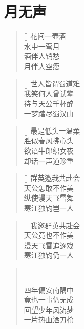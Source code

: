 \chapter{月无声}
\thispagestyle{empty}

\renewcommand{\poemtoc}{section}
\settowidth{\versewidth}{花间一壶酒}
\begin{verse}[\versewidth]
花间一壶酒\\
水中一弯月\\
酒伴人销愁\\
月伴人空瘦
\end{verse}

\renewcommand{\poemtoc}{section}
\settowidth{\versewidth}{世人皆谓蜀道难}
\begin{verse}[\versewidth]
世人皆谓蜀道难\\
我笑何人曾试攀\\
待与天公千杯醉\\
一梦踏尽蜀汉山
\end{verse}

\renewcommand{\poemtoc}{section}
\settowidth{\versewidth}{最是低头一温柔}
\begin{verse}[\versewidth]
最是低头一温柔\\
胜似春风拂心头\\
欲语牛郎织女夜\\
却话一声道珍重
\end{verse}

\renewcommand{\poemtoc}{section}
\settowidth{\versewidth}{群英邀我共赴会}
\begin{verse}[\versewidth]
群英邀我共赴会\\
天公怎敢不作美\\
纵使漫天飞雪舞\\
寒江独钓岂一人
\end{verse}

\renewcommand{\poemtoc}{section}
\settowidth{\versewidth}{群英邀我共赴会}
\begin{verse}[\versewidth]
我邀群英共赴会\\
天公竟也不作美\\
漫天飞雪追逐戏\\
寒江独钓仍一人
\end{verse}
\newpage

\renewcommand{\poemtoc}{section}
\settowidth{\versewidth}{四年偏安南隅中}
\begin{verse}[\versewidth]

四年偏安南隅中\\
竟也一事仍无成\\
回望少年风流梦\\
一片热血洒刀枪
\end{verse}

